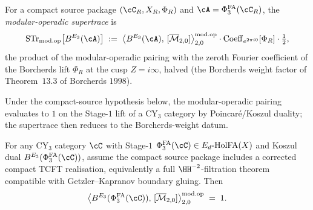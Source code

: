 \begin{definition}
\label{def:modular-operadic-supertrace-chapter}
For a compact source package $(\cC_R,X_R,\Phi_R)$ and
$\cA = \PhiFA_3(\cC_R)$, the
\emph{modular-operadic supertrace} is
\[
 \STr_{\modop}\bigl[B^{E_3}(\cA)\bigr]
 \;:=\;
 \bigl\langle
 B^{E_3}(\cA),\, [\Mbar_{2, 0}]
 \bigr\rangle^{\modop}_{2, 0}
 \cdot
 \mathrm{Coeff}_{e^{2 \pi i 0}}[\Phi_R]
 \cdot \tfrac{1}{2},
\]
the product of the modular-operadic pairing with the zeroth Fourier
coefficient of the Borcherds lift $\Phi_R$ at the cusp $Z = i \infty$,
halved (the Borcherds weight factor of Theorem~$13.3$ of Borcherds
$1998$).
\end{definition}

Under the compact-source hypothesis below, the modular-operadic pairing
evaluates to $1$ on the Stage-$1$ lift of a CY$_3$ category by
Poincar\'e/Koszul duality; the supertrace then reduces to the
Borcherds-weight datum.

\begin{proposition}
\label{prop:mod-op-pairing-normalisation}
For any CY$_3$ category $\cC$ with Stage-$1$ $\PhiFA_3(\cC) \in
\EdHolFA(X)$ and Koszul dual $B^{E_3}(\PhiFA_3(\cC))$, assume the
compact source package includes a corrected compact TCFT realisation,
equivalently a full $\HH^{-2}$-filtration theorem compatible with
Getzler--Kapranov boundary gluing. Then
\[
 \bigl\langle
 B^{E_3}(\PhiFA_3(\cC)),\, [\Mbar_{2, 0}]
 \bigr\rangle^{\modop}_{2, 0}
 \;=\; 1.
\]
\end{proposition}

